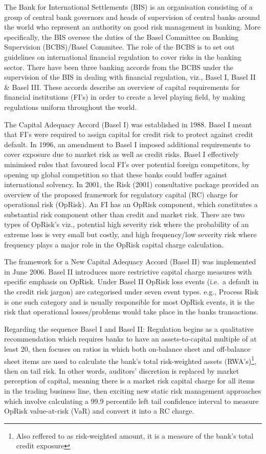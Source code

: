 \documentclass[]{DissertateUSU}
\let\rmarkdownfootnote\footnote%
\def\footnote{\protect\rmarkdownfootnote}
\begin{document}
The Bank for International Settlements (BIS) is an organisation
consisting of a group of central bank governors and heads of supervision
of central banks around the world who represent an authority on good
risk management in banking. More specifically, the BIS oversee the
duties of the Basel Committee on Banking Supervision (BCBS)/Basel
Commitee. The role of the BCBS is to set out guidelines on international
financial regulation to cover risks in the banking sector. There have
been three banking accords from the BCBS under the supervision of the
BIS in dealing with financial regulation, viz., Basel I, Basel II \&
Basel III. These accords describe an overview of capital requirements
for financial institutions (FI's) in order to create a level playing
field, by making regulations uniform throughout the world.\medskip 

The Capital Adequacy Accord (Basel I) was established in 1988. Basel I
meant that FI's were required to assign capital for credit risk to
protect against credit default. In 1996, an amendment to Basel I imposed
additional requirements to cover exposure due to market risk as well as
credit risks. Basel I effectively minimised rules that favoured local
FI's over potential foreign competitors, by opening up global
competition so that these banks could buffer against international
solvency. In 2001, the Risk (2001) consultative package provided an
overview of the proposed framework for regulatory capital (RC) charge
for operational risk (OpRisk). An FI has an OpRisk component, which
constitutes a substantial risk component other than credit and market
risk. There are two types of OpRisk's viz., potential high severity risk
where the probability of an extreme loss is very small but costly, and
high frequency/low severity risk where frequency plays a major role in
the OpRisk capital charge calculation.\medskip 

The framework for a New Capital Adequacy Accord (Basel II) was
implemented in June 2006. Basel II introduces more restrictive capital
charge measures with specific emphasis on OpRisk. Under Basel II OpRisk
loss events (i.e.~a default in the credit risk jargon) are categorised
under seven event types. e.g., Process Risk is one such category and is
usually responsible for most OpRisk events, it is the risk that
operational losses/problems would take place in the banks
transactions.\medskip

Regarding the sequence Basel I and Basel II: Regulation begins as a
qualitative recommendation which requires banks to have an
assets-to-capital multiple of at least 20, then focuses on ratios in
which both on-balance sheet and off-balance sheet items are used to
calculate the bank's total risk-weighted assets
(RWA's)\footnote{Also reffered to as risk-weighted amount, it is a measure of the bank's total credit exposure},
then on tail risk. In other words, auditors' discretion is replaced by
market perception of capital, meaning there is a market risk capital
charge for all items in the trading business line, then exciting new
static risk management approaches which involve calculating a 99.9
percentile left tail confidence interval to measure OpRisk value-at-risk
(VaR) and convert it into a RC charge.\medskip 
\end{document}
